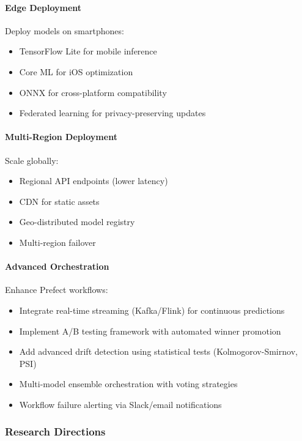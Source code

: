 \paragraph{Edge Deployment}
Deploy models on smartphones:
\begin{itemize}
    \item TensorFlow Lite for mobile inference
    \item Core ML for iOS optimization
    \item ONNX for cross-platform compatibility
    \item Federated learning for privacy-preserving updates
\end{itemize}

\paragraph{Multi-Region Deployment}
Scale globally:
\begin{itemize}
    \item Regional API endpoints (lower latency)
    \item CDN for static assets
    \item Geo-distributed model registry
    \item Multi-region failover
\end{itemize}

\paragraph{Advanced Orchestration}
Enhance Prefect workflows:
\begin{itemize}
    \item Integrate real-time streaming (Kafka/Flink) for continuous predictions
    \item Implement A/B testing framework with automated winner promotion
    \item Add advanced drift detection using statistical tests (Kolmogorov-Smirnov, PSI)
    \item Multi-model ensemble orchestration with voting strategies
    \item Workflow failure alerting via Slack/email notifications
\end{itemize}

\subsubsection{Research Directions}

